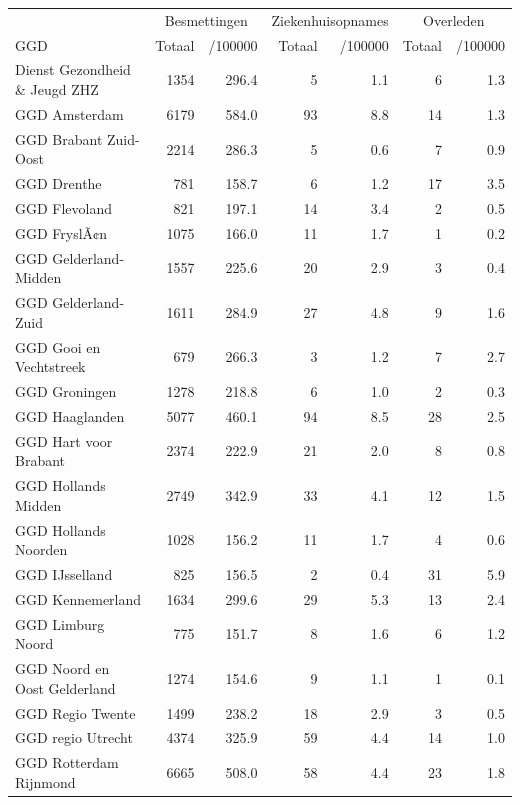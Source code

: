 \documentclass[
  english,
  man,floatsintext]{apa6}
\begin{document}
\begin{table}[H]
\centering\begingroup\fontsize{10}{12}\selectfont

\begin{threeparttable}
\begin{tabular}{lrrrrrr}
\toprule
\multicolumn{1}{c}{ } & \multicolumn{2}{c}{Besmettingen} & \multicolumn{2}{c}{Ziekenhuisopnames} & \multicolumn{2}{c}{Overleden} \\
\cmidrule(l{3pt}r{3pt}){2-3} \cmidrule(l{3pt}r{3pt}){4-5} \cmidrule(l{3pt}r{3pt}){6-7}
GGD & Totaal & /100000 & Totaal & /100000 & Totaal & /100000\\
\midrule
Dienst Gezondheid \& Jeugd ZHZ & 1354 & 296.4 & 5 & 1.1 & 6 & 1.3\\
GGD Amsterdam & 6179 & 584.0 & 93 & 8.8 & 14 & 1.3\\
GGD Brabant Zuid-Oost & 2214 & 286.3 & 5 & 0.6 & 7 & 0.9\\
GGD Drenthe & 781 & 158.7 & 6 & 1.2 & 17 & 3.5\\
GGD Flevoland & 821 & 197.1 & 14 & 3.4 & 2 & 0.5\\
GGD FryslÃ¢n & 1075 & 166.0 & 11 & 1.7 & 1 & 0.2\\
GGD Gelderland-Midden & 1557 & 225.6 & 20 & 2.9 & 3 & 0.4\\
GGD Gelderland-Zuid & 1611 & 284.9 & 27 & 4.8 & 9 & 1.6\\
GGD Gooi en Vechtstreek & 679 & 266.3 & 3 & 1.2 & 7 & 2.7\\
GGD Groningen & 1278 & 218.8 & 6 & 1.0 & 2 & 0.3\\
GGD Haaglanden & 5077 & 460.1 & 94 & 8.5 & 28 & 2.5\\
GGD Hart voor Brabant & 2374 & 222.9 & 21 & 2.0 & 8 & 0.8\\
GGD Hollands Midden & 2749 & 342.9 & 33 & 4.1 & 12 & 1.5\\
GGD Hollands Noorden & 1028 & 156.2 & 11 & 1.7 & 4 & 0.6\\
GGD IJsselland & 825 & 156.5 & 2 & 0.4 & 31 & 5.9\\
GGD Kennemerland & 1634 & 299.6 & 29 & 5.3 & 13 & 2.4\\
GGD Limburg Noord & 775 & 151.7 & 8 & 1.6 & 6 & 1.2\\
GGD Noord en Oost Gelderland & 1274 & 154.6 & 9 & 1.1 & 1 & 0.1\\
GGD Regio Twente & 1499 & 238.2 & 18 & 2.9 & 3 & 0.5\\
GGD regio Utrecht & 4374 & 325.9 & 59 & 4.4 & 14 & 1.0\\
GGD Rotterdam Rijnmond & 6665 & 508.0 & 58 & 4.4 & 23 & 1.8\\

\end{tabular}
\end{threeparttable}
\end{table}
\end{document}
